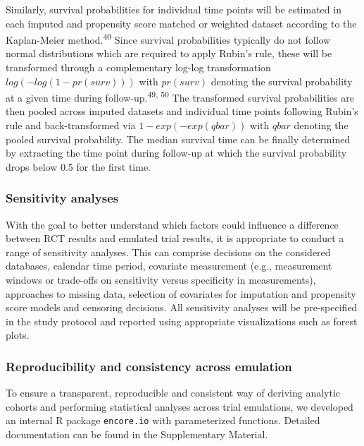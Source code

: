 \documentclass[
  letterpaper,
  DIV=11,
  numbers=noendperiod]{scrartcl}
\begin{document}
Similarly, survival probabilities for individual time points will be
estimated in each imputed and propensity score matched or weighted
dataset according to the Kaplan-Meier method.\textsuperscript{40} Since
survival probabilities typically do not follow normal distributions
which are required to apply Rubin's rule, these will be transformed
through a complementary log-log transformation \(log(-log(1-pr(surv)))\)
with \(pr(surv)\) denoting the survival probability at a given time
during follow-up.\textsuperscript{49, 50} The transformed survival
probabilities are then pooled across imputed datasets and individual
time points following Rubin's rule and back-transformed via
\(1-exp(-exp(qbar))\) with \(qbar\) denoting the pooled survival
probability. The median survival time can be finally determined by
extracting the time point during follow-up at which the survival
probability drops below 0.5 for the first time.

\subsubsection{Sensitivity analyses}\label{sensitivity-analyses}

With the goal to better understand which factors could influence a
difference between RCT results and emulated trial results, it is
appropriate to conduct a range of sensitivity analyses. This can
comprise decisions on the considered databases, calendar time period,
covariate measurement (e.g., measurement windows or trade-offs on
sensitivity versus specificity in measurements), approaches to missing
data, selection of covariates for imputation and propensity score models
and censoring decisions. All sensitivity analyses will be pre-specified
in the study protocol and reported using appropriate visualizations such
as forest plots.

\subsubsection{Reproducibility and consistency across
emulation}\label{reproducibility-and-consistency-across-emulation}

To ensure a transparent, reproducible and consistent way of deriving
analytic cohorts and performing statistical analyses across trial
emulations, we developed an internal R package \texttt{encore.io} with
parameterized functions. Detailed documentation can be found in the
Supplementary Material.

\newpage{}
\end{document}
